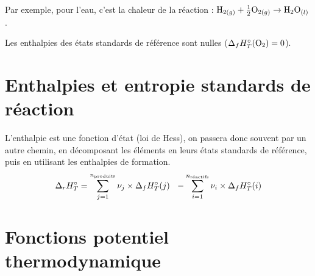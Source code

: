 \documentclass[13pt, twoside, a4paper, french]{report}
\begin{document}
            Par exemple, pour l'eau, c'est la chaleur de la réaction : $\textrm{H}_{2(g)} + \frac{1}{2} \textrm{O}_{2(g)} \rightarrow \textrm{H}_2\textrm{O}_{(l)}$.
            \smallskip

            Les enthalpies des états standards de référence sont nulles ($\Delta_f H^\circ_T(\textrm{O}_2) = 0$).


    \section{Enthalpies et entropie standards de réaction}

        L'enthalpie est une fonction d'état (loi de Hess), on passera donc souvent par un autre chemin, en décomposant les éléments en leurs états standards de référence, puis en utilisant les enthalpies de formation.
        \[\Delta_r H^\circ_T = \sum^{n_\textrm{produits}}_{j=1} \nu_j \times \Delta_f H^\circ_T(j)\ \ - \sum^{n_\textrm{réactifs}}_{i=1} \nu_i \times \Delta_f H^\circ_T(i)\]


    \section{Fonctions potentiel thermodynamique}
\end{document}
